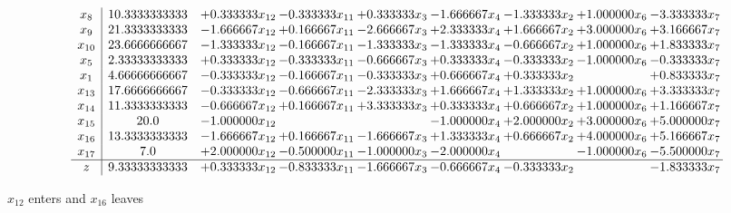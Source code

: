 \documentclass[10pt]{article}
\begin{document}
 \[\begin{array}{c| c c@{\hskip 2pt} c@{\hskip 2pt} c@{\hskip 2pt} c@{\hskip 2pt} c@{\hskip 2pt} c@{\hskip 2pt} c@{\hskip 2pt} }
 x_{8}   &  10.3333333333 & + 0.333333 x_{12} & -0.333333 x_{11} & + 0.333333 x_{3} & -1.666667 x_{4} & -1.333333 x_{2} & + 1.000000 x_{6} & -3.333333 x_{7}\\
 x_{9}   &  21.3333333333 & -1.666667 x_{12} & + 0.166667 x_{11} & -2.666667 x_{3} & + 2.333333 x_{4} & + 1.666667 x_{2} & + 3.000000 x_{6} & + 3.166667 x_{7}\\
 x_{10}   &  23.6666666667 & -1.333333 x_{12} & -0.166667 x_{11} & -1.333333 x_{3} & -1.333333 x_{4} & -0.666667 x_{2} & + 1.000000 x_{6} & + 1.833333 x_{7}\\
 x_{5}   &  2.33333333333 & + 0.333333 x_{12} & -0.333333 x_{11} & -0.666667 x_{3} & + 0.333333 x_{4} & -0.333333 x_{2} & -1.000000 x_{6} & -0.333333 x_{7}\\
 x_{1}   &  4.66666666667 & -0.333333 x_{12} & -0.166667 x_{11} & -0.333333 x_{3} & + 0.666667 x_{4} & + 0.333333 x_{2} &   & + 0.833333 x_{7}\\
 x_{13}   &  17.6666666667 & -0.333333 x_{12} & -0.666667 x_{11} & -2.333333 x_{3} & + 1.666667 x_{4} & + 1.333333 x_{2} & + 1.000000 x_{6} & + 3.333333 x_{7}\\
 x_{14}   &  11.3333333333 & -0.666667 x_{12} & + 0.166667 x_{11} & + 3.333333 x_{3} & + 0.333333 x_{4} & + 0.666667 x_{2} & + 1.000000 x_{6} & + 1.166667 x_{7}\\
 x_{15}   &  20.0 & -1.000000 x_{12} &    &   & -1.000000 x_{4} & + 2.000000 x_{2} & + 3.000000 x_{6} & + 5.000000 x_{7}\\
 x_{16}   &  13.3333333333 & -1.666667 x_{12} & + 0.166667 x_{11} & -1.666667 x_{3} & + 1.333333 x_{4} & + 0.666667 x_{2} & + 4.000000 x_{6} & + 5.166667 x_{7}\\
 x_{17}   &  7.0 & + 2.000000 x_{12} & -0.500000 x_{11} & -1.000000 x_{3} & -2.000000 x_{4} &   & -1.000000 x_{6} & -5.500000 x_{7}\\
\hline
z    &  9.33333333333 & + 0.333333 x_{12} & -0.833333 x_{11} & -1.666667 x_{3} & -0.666667 x_{4} & -0.333333 x_{2} &   & -1.833333 x_{7}\\
\end{array}\]


 $ x_{12} $ enters and $ x_{16} $ leaves 
\end{document}
